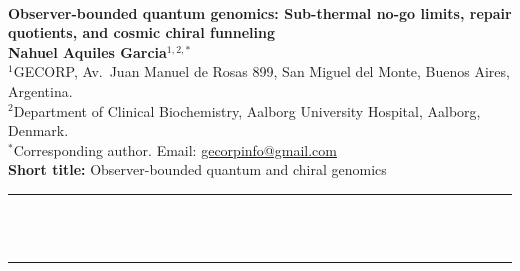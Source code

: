 \documentclass[10pt,letterpaper]{article}
\theoremstyle{plain}
\theoremstyle{definition}
\begin{document}
\thispagestyle{plain}

\\[0.6em]
{\LARGE\textbf{Observer-bounded quantum genomics: Sub-thermal no-go limits, repair quotients, and cosmic chiral funneling}}\\[0.75em]
{\normalsize\textbf{Nahuel Aquiles Garcia}$^{1,2,*}$}\\[0.4em]
{\footnotesize
$^{1}$GECORP, Av.\ Juan Manuel de Rosas 899, San Miguel del Monte, Buenos Aires, Argentina.\\[0.15em]
$^{2}$Department of Clinical Biochemistry, Aalborg University Hospital, Aalborg, Denmark.\\[0.15em]
$^{*}$Corresponding author. Email: \href{mailto:gecorpinfo@gmail.com}{gecorpinfo@gmail.com}\\[0.35em]
\textbf{Short title:} Observer-bounded quantum and chiral genomics
}\\[0.55em]
\noindent\rule{\textwidth}{0.6pt}\\[0.3em]
\\[0.15em]
\noindent\rule{\textwidth}{0.6pt}

\vspace{0.4em}
\begin{abstract}
\noindent Quantum proton transfer, purine radical-cation migration, and parity-violating astroparticles continually perturb DNA, yet cells access these events only after femtosecond hydration dephasing, chromatin-gated repair, and sparse molecular recording. Without unified physical channel bounds, sub-thermal electromagnetic claims and cosmic-chiral hypotheses remain disconnected from genomics. Here, I formulate mutagenesis and lesion readout as a six-stage observer-bounded Markov channel and test stage-specific consistency across bacterial evolution, cryo-electron microscopy nucleosomes, donor-matched 24-hour human islet single-cell transcriptomes, and HepG2 and K562 promoter assays. Three-state Mori--Zwanzig and Floquet--Lindblad bounds show that $1\,\mu\mathrm{V\,m^{-1}}$ oscillatory fields shift tautomer hazards at least $23$ orders below $50\,\mathrm{mK}$ thermal noise, whereas guanine stacking concentrates 8-oxoguanine $17.95$-fold and exploratory cosmic-lepton models yield a $2.71 \times 10^{27}$ electromagnetic-to-weak cross-section ratio with inward helical deflection beyond $26.9^\circ$. Stage-resolved cohorts support each terrestrial bottleneck, recover oxidative-stress state across pooled human islet repair ensembles, and define a polarized-lepton laboratory test.
\end{abstract}
\end{document}
